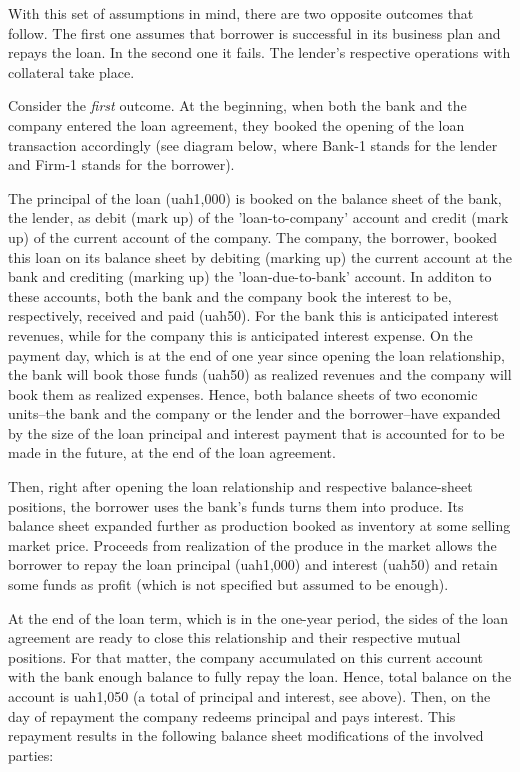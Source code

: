 With this set of assumptions in mind, there are two opposite outcomes that follow. The first one assumes that borrower is successful in its business plan and repays the loan. In the second one it fails. The lender's respective operations with collateral take place.

Consider the \textit{first} outcome. At the beginning, when both the bank and the company entered the loan agreement, they booked the opening of the loan transaction accordingly (see diagram below, where Bank-1 stands for the lender and Firm-1 stands for the borrower).

The principal of the loan (\ac{uah}1,000) is booked on the balance sheet of the bank, the lender, as debit (mark up) of the 'loan-to-company' account and credit (mark up) of the current account of the company. The company, the borrower, booked this loan on its balance sheet by debiting (marking up) the current account at the bank and crediting (marking up) the 'loan-due-to-bank' account. In additon to these accounts, both the bank and the company book the interest to be, respectively, received and paid (\ac{uah}50). For the bank this is anticipated interest revenues, while for the company this is anticipated interest expense. On the payment day, which is at the end of one year since opening the loan relationship, the bank will book those funds (\ac{uah}50) as realized revenues and the company will book them as realized expenses. Hence, both balance sheets of two economic units--the bank and the company or the lender and the borrower--have expanded by the size of the loan principal and interest payment that is accounted for to be made in the future, at the end of the loan agreement.

Then, right after opening the loan relationship and respective balance-sheet positions, the borrower uses the bank's funds turns them into produce. Its balance sheet expanded further as production booked as inventory at some selling market price. Proceeds from realization of the produce in the market allows the borrower to repay the loan principal (\ac{uah}1,000) and interest (\ac{uah}50) and retain some funds as profit (which is not specified but assumed to be enough).

At the end of the loan term, which is in the one-year period, the sides of the loan agreement are ready to close this relationship and their respective mutual positions. For that matter, the company accumulated on this current account with the bank enough balance to fully repay the loan. Hence, total balance on the account is \ac{uah}1,050 (a total of principal and interest, see above). Then, on the day of repayment the company redeems principal and pays interest. This repayment results in the following balance sheet modifications of the involved parties: 

